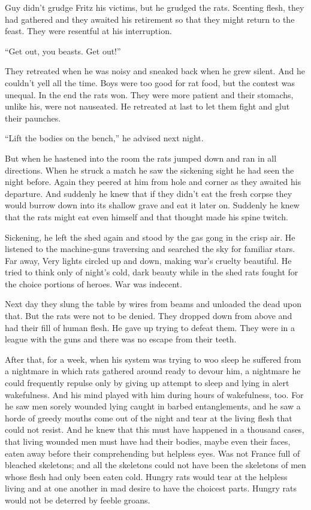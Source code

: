 Guy didn't grudge Fritz his victims, but he grudged the rats. Scenting flesh, they had gathered and they awaited his retirement so that they might return to the feast. They were resentful at his interruption.

``Get out, you beasts. Get out!''

They retreated when he was noisy and sneaked back when he grew silent. And he couldn't yell all the time. Boys were too good for rat food, but the contest was unequal. In the end the rats won. They were more patient and their stomachs, unlike his, were not nauseated. He retreated at last to let them fight and glut their paunches.

``Lift the bodies on the bench,'' he advised next night.

But when he hastened into the room the rats jumped down and ran in all directions. When he struck a match he saw the sickening sight he had seen the night before. Again they peered at him from hole and corner as they awaited his departure. And suddenly he knew that if they didn't eat the fresh corpse they would burrow down into its shallow grave and eat it later on. Suddenly he knew that the rats might eat even himself and that thought made his spine twitch.

Sickening, he left the shed again and stood by the gas gong in the crisp air. He listened to the machine-guns traversing and searched the sky for familiar stars. Far away, Very lights circled up and down, making war's cruelty beautiful. He tried to think only of night's cold, dark beauty while in the shed rats fought for the choice portions of heroes. War was indecent.

Next day they slung the table by wires from beams and unloaded the dead upon that. But the rats were not to be denied. They dropped down from above and had their fill of human flesh. He gave up trying to defeat them. They were in a league with the guns and there was no escape from their teeth.

After that, for a week, when his system was trying to woo sleep he suffered from a nightmare in which rats gathered around ready to devour him, a nightmare he could frequently repulse only by giving up attempt to sleep and lying in alert wakefulness. And his mind played with him during hours of wakefulness, too. For he saw men sorely wounded lying caught in barbed entanglements, and he saw a horde of greedy mouths come out of the night and tear at the living flesh that could not resist. And he knew that this must have happened in a thousand cases, that living wounded men must have had their bodies, maybe even their faces, eaten away before their comprehending but helpless eyes. Was not France full of bleached skeletons; and all the skeletons could not have been the skeletons of men whose flesh had only been eaten cold. Hungry rats would tear at the helpless living and at one another in mad desire to have the choicest parts. Hungry rats would not be deterred by feeble groans.

